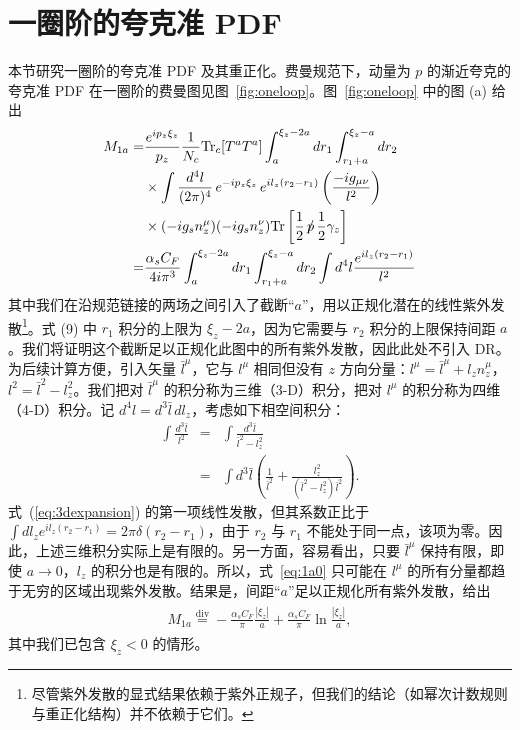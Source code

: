 \section{一圈阶的夸克准 PDF}
\label{sec:oneloop}

本节研究一圈阶的夸克准 PDF 及其重正化。费曼规范下，动量为 $p$ 的渐近夸克的夸克准 PDF 在一圈阶的费曼图见图~\ref{fig:oneloop}。图~\ref{fig:oneloop} 中的图 (a) 给出
\begin{align}
\begin{split}\label{eq:1a0}
M_{1a}=&\frac{e^{i p_z \xi_z}}{p_z}\frac{1}{N_c} \text{Tr}_c[T^aT^a] \int_a^{\xi_z-2a}dr_1\int_{r_1+a}^{\xi_z-a}dr_2\\
&\times \int \frac{d^4l}{(2\pi)^4} \,e^{-i p_z \xi_z} \,e^{il_z(r_2-r_1)} \left(\frac{-ig_{\mu\nu}}{l^2}\right) \\
&\times (-ig_s n_z^\mu)(-ig_s n_z^\nu)  \text{Tr}\left[\frac{1}{2}\, \slashed{p}\, \frac{1}{2}\gamma_z\right]   \\
=& \frac{\alpha_s C_F}{4 i \pi^3} \int_a^{\xi_z-2a}dr_1\int_{r_1+a}^{\xi_z-a}dr_2 \int d^4l\frac{e^{il_z(r_2-r_1)}}{l^2}
\end{split}
\end{align}
其中我们在沿规范链接的两场之间引入了截断``$a$''，用以正规化潜在的线性紫外发散\footnote{尽管紫外发散的显式结果依赖于紫外正规子，但我们的结论（如幂次计数规则与重正化结构）并不依赖于它们。}。式 (9) 中 $r_1$ 积分的上限为 $\xi_z-2a$，因为它需要与 $r_2$ 积分的上限保持间距 $a$。我们将证明这个截断足以正规化此图中的所有紫外发散，因此此处不引入 DR。为后续计算方便，引入矢量 $\bar{l}^\mu$，它与 $l^\mu$ 相同但没有 $z$ 方向分量：$l^\mu = \bar{l}^\mu + l_z n_z^\mu$，$l^2=\bar{l}^2-l_z^2$。我们把对 $\bar{l}^\mu$ 的积分称为三维（3-D）积分，把对 $l^\mu$ 的积分称为四维（4-D）积分。记 $d^4l = d^{3}\bar{l}\, dl_z$，考虑如下相空间积分：
\begin{eqnarray}\label{eq:3dexpansion}
\int \frac{d^{3}\bar{l}}{l^2} &=&
\int \frac{d^{3}\bar{l}}{\bar{l}^2-l_z^2}
\nonumber\\
&=& \int d^{3}\bar{l} \left( \frac{1}{\bar{l}^2}+ \frac{l_z^2}{(\bar{l}^2-l_z^2)\bar{l}^2}\right).
\end{eqnarray}
式~(\ref{eq:3dexpansion}) 的第一项线性发散，但其系数正比于 $\int dl_z e^{il_z(r_2-r_1)} = 2\pi \delta(r_2-r_1)$，由于 $r_2$ 与 $r_1$ 不能处于同一点，该项为零。因此，上述三维积分实际上是有限的。另一方面，容易看出，只要 $\bar{l}^\mu$ 保持有限，即使 $a\to 0$，$l_z$ 的积分也是有限的。所以，式~\eqref{eq:1a0} 只可能在 $l^\mu$ 的所有分量都趋于无穷的区域出现紫外发散。结果是，间距``$a$''足以正规化所有紫外发散，给出
\begin{align}\label{eq:1a}
\begin{split}
M_{1a}\overset{\text{div}}{=}-\frac{\alpha_s C_F}{\pi}\frac{|\xi_z|}{a}+\frac{\alpha_s C_F}{\pi}\ln \frac{|\xi_z|}{a},
\end{split}
\end{align}
其中我们已包含 $\xi_z < 0$ 的情形。


